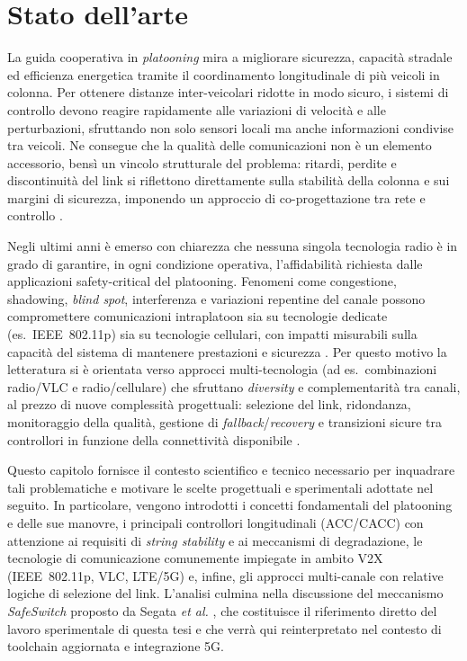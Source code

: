 \chapter{Stato dell’arte}
\label{ch:sota}

La guida cooperativa in \emph{platooning} mira a migliorare sicurezza, capacità stradale ed efficienza energetica tramite il coordinamento longitudinale di più veicoli in colonna. Per ottenere distanze inter-veicolari ridotte in modo sicuro, i sistemi di controllo devono reagire rapidamente alle variazioni di velocità e alle perturbazioni, sfruttando non solo sensori locali ma anche informazioni condivise tra veicoli. Ne consegue che la qualità delle comunicazioni non è un elemento accessorio, bensì un vincolo strutturale del problema: ritardi, perdite e discontinuità del link si riflettono direttamente sulla stabilità della colonna e sui margini di sicurezza, imponendo un approccio di co-progettazione tra rete e controllo \cite{dressler2019cooperative,giordano2019joint,segata2016safe}.

Negli ultimi anni è emerso con chiarezza che nessuna singola tecnologia radio è in grado di garantire, in ogni condizione operativa, l’affidabilità richiesta dalle applicazioni safety-critical del platooning. Fenomeni come congestione, shadowing, \emph{blind spot}, interferenza e variazioni repentine del canale possono compromettere comunicazioni intraplatoon sia su tecnologie dedicate (es.\ IEEE~802.11p) sia su tecnologie cellulari, con impatti misurabili sulla capacità del sistema di mantenere prestazioni e sicurezza \cite{segata2015communication,bazzi2020wireless}. Per questo motivo la letteratura si è orientata verso approcci multi-tecnologia (ad es.\ combinazioni radio/VLC e radio/cellulare) che sfruttano \emph{diversity} e complementarità tra canali, al prezzo di nuove complessità progettuali: selezione del link, ridondanza, monitoraggio della qualità, gestione di \emph{fallback}/\emph{recovery} e transizioni sicure tra controllori in funzione della connettività disponibile \cite{ishihara2015improving,segata2016platooning,segata2023multi-technology}.

Questo capitolo fornisce il contesto scientifico e tecnico necessario per inquadrare tali problematiche e motivare le scelte progettuali e sperimentali adottate nel seguito. In particolare, vengono introdotti i concetti fondamentali del platooning e delle sue manovre, i principali controllori longitudinali (ACC/CACC) con attenzione ai requisiti di \emph{string stability} e ai meccanismi di degradazione, le tecnologie di comunicazione comunemente impiegate in ambito V2X (IEEE~802.11p, VLC, LTE/5G) e, infine, gli approcci multi-canale con relative logiche di selezione del link. L’analisi culmina nella discussione del meccanismo \emph{SafeSwitch} proposto da Segata \emph{et al.} \cite{segata2023multi-technology}, che costituisce il riferimento diretto del lavoro sperimentale di questa tesi e che verrà qui reinterpretato nel contesto di toolchain aggiornata e integrazione 5G.
